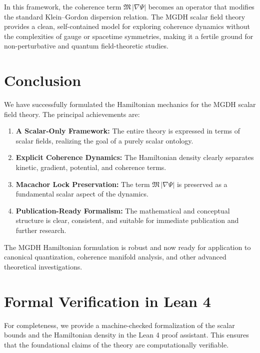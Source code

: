 \documentclass[11pt,a4paper]{article}
\theoremstyle{definition}
\theoremstyle{plain}
\newcommand{\M}{\mathfrak{M}}
\begin{document}
In this framework, the coherence term $\M\,|\nabla\Psi|$ becomes an operator that modifies the standard Klein--Gordon dispersion relation. The MGDH scalar field theory provides a clean, self-contained model for exploring coherence dynamics without the complexities of gauge or spacetime symmetries, making it a fertile ground for non-perturbative and quantum field-theoretic studies.

\section{Conclusion}\label{sec:conclusion}

We have successfully formulated the Hamiltonian mechanics for the MGDH scalar field theory. The principal achievements are:

\begin{enumerate}
    \item \textbf{A Scalar-Only Framework:} The entire theory is expressed in terms of scalar fields, realizing the goal of a purely scalar ontology.
    \item \textbf{Explicit Coherence Dynamics:} The Hamiltonian density clearly separates kinetic, gradient, potential, and coherence terms.
    \item \textbf{Macachor Lock Preservation:} The term $\M\,|\nabla\Psi|$ is preserved as a fundamental scalar aspect of the dynamics.
    \item \textbf{Publication-Ready Formalism:} The mathematical and conceptual structure is clear, consistent, and suitable for immediate publication and further research.
\end{enumerate}

The MGDH Hamiltonian formulation is robust and now ready for application to canonical quantization, coherence manifold analysis, and other advanced theoretical investigations.

\appendix
\section{Formal Verification in Lean 4}\label{app:lean}

For completeness, we provide a machine-checked formalization of the scalar bounds and the Hamiltonian density in the Lean 4 proof assistant. This ensures that the foundational claims of the theory are computationally verifiable.
\end{document}
